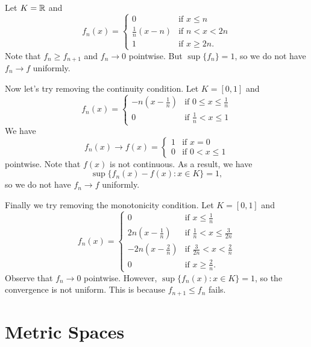 \begin{example}
  Let $K = \mathbb{R}$ and
  \[
    f_n(x) = \begin{cases}
      0 & \text{if } x \le n \\
      \frac{1}{n}(x - n) & \text{if } n < x < 2n \\
      1 & \text{if } x \ge 2n.
    \end{cases}
  \]
  Note that $f_n \ge f_{n + 1}$ and $f_n \to 0$ pointwise.
  But $\sup\{f_n\} = 1$, so we do not have $f_n \to f$
  uniformly.
\end{example}

\begin{example}
  Now let's try removing the continuity condition.
  Let $K = [0, 1]$ and
  \[
    f_n(x) = \begin{cases}
      -n (x - \frac{1}{n}) & \text{if } 0 \le x \le \frac{1}{n} \\
      0 & \text{if } \frac{1}{n} < x \le 1
    \end{cases}
  \]
  We have
  \[
    f_n(x) \to f(x)
    = \begin{cases}
      1 & \text{if } x = 0 \\
      0 & \text{if } 0 < x \le 1
    \end{cases}
  \]
  pointwise. Note that $f(x)$ is not continuous.
  As a result, we have
  \[\sup\{f_n(x) - f(x) : x \in K\} = 1,\]
  so we do not have $f_n \to f$ uniformly.
\end{example}

\begin{example}
  Finally we try removing the monotonicity condition.
  Let $K = [0, 1]$ and
  \[
    f_n(x) = \begin{cases}
      0 & \text{if } x \le \frac{1}{n} \\
      2n(x - \frac{1}{n}) & \text{if } \frac{1}{n} < x \le \frac{3}{2n} \\
      -2n(x - \frac{2}{n}) & \text{if } \frac{3}{2n} < x < \frac{2}{n} \\
      0 & \text{if } x \ge \frac{2}{n}.
    \end{cases}
  \]
  Observe that $f_n \to 0$ pointwise. However,
  $\sup\{f_n(x) : x \in K\} = 1$, so the convergence is
  not uniform. This is because $f_{n + 1} \le f_n$ fails.
\end{example}

\section{Metric Spaces}

